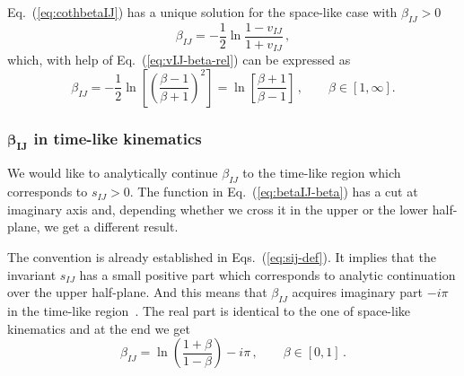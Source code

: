 \documentclass[a4paper,11pt]{report}
\numberwithin{equation}{section}
\newcommand{\betaIJ}{\beta_{IJ}}
\newcommand{\vIJ}{v_{IJ}}
\newcommand{\sIJ}{s_{IJ}}
\begin{document}
Eq.~(\ref{eq:cothbetaIJ}) has a unique solution for the space-like case with
$\betaIJ >0$~\cite{MyNotes}
%
\begin{equation}
  \betaIJ =  -\frac12 \ln \frac{1-\vIJ}{1+\vIJ}\,,
  \label{eq:betaIJ-vIJ}
\end{equation}
%
which, with help of Eq.~(\ref{eq:vIJ-beta-rel}) can be expressed as
%
\begin{equation}
 \betaIJ = -\frac12 \ln\left[\left(\frac{\beta-1}{\beta+1}\right)^2\right]
         = \ln\left[\frac{\beta+1}{\beta-1}\right]\,,
  \qquad \beta \in [1,\infty].
  \label{eq:betaIJ-beta}
\end{equation}

\subsubsection{$\mathbold{\betaIJ}$ in time-like kinematics}

We would like to analytically continue $\betaIJ$ to the time-like region which
corresponds to $\sIJ > 0$. The function in Eq.~(\ref{eq:betaIJ-beta}) has a cut
at imaginary axis and, depending whether we cross it in the upper or the
lower half-plane, we get a different result.

The convention is already established in Eqs.~(\ref{eq:sij-def}).
It implies that the invariant $\sIJ$  has a small
positive part which corresponds to analytic continuation over the upper
half-plane. And this means that $\betaIJ$ acquires imaginary part $- i \pi$ in
the time-like region~\cite{AnalyticContinuation}. The real part is identical to
the one of space-like kinematics and at the end we get
%
\begin{equation}
  \betaIJ = \ln\left(\frac{1+\beta}{1-\beta}\right) - i \pi\,,
  \qquad \beta \in [0,1]\,.
\end{equation}
\end{document}
